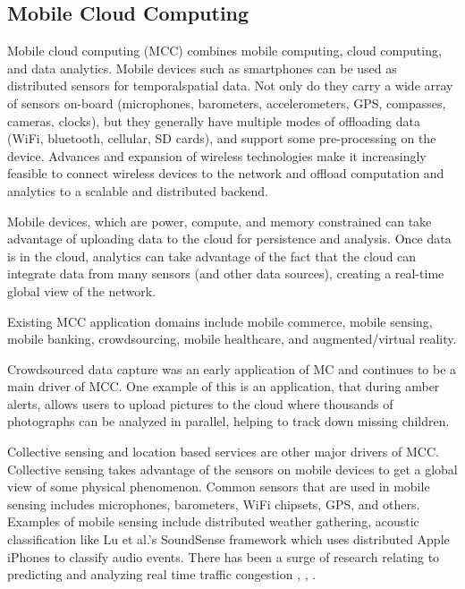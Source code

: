 \documentclass[]{article}
\begin{document}
\subsection{Mobile Cloud Computing} \label{ssec:mobile-cloud-computing}
Mobile cloud computing (MCC) combines mobile computing, cloud computing, and data analytics\cite{wang_mobile_survey_2015}. Mobile devices such as smartphones can be used as distributed sensors for temporalspatial data. Not only do they carry a wide array of sensors on-board (microphones, barometers, accelerometers, GPS, compasses, cameras, clocks), but they generally have multiple modes of offloading data (WiFi, bluetooth, cellular, SD cards), and support some pre-processing on the device. Advances and expansion of wireless technologies make it increasingly feasible to connect wireless devices to the network and offload computation and analytics to a scalable and distributed backend\cite{barbera_offload_2013}.

Mobile devices, which are power, compute, and memory constrained can take advantage of uploading data to the cloud for persistence and analysis. Once data is in the cloud, analytics can take advantage of the fact that the cloud can integrate data from many sensors (and other data sources), creating a real-time global view of the network.

Existing MCC application domains include mobile commerce, mobile sensing, mobile banking, crowdsourcing, mobile healthcare, and augmented/virtual reality.

Crowdsourced data capture was an early application of MC\cite{campbell_rise_2008} and continues to be a main driver of MCC. One example of this is an application, that during amber alerts, allows users to upload pictures to the cloud where thousands of photographs can be analyzed in parallel, helping to track down missing children\cite{satyanarayanan_mobile_2010}.

Collective sensing and location based services are other major drivers of MCC. Collective sensing takes advantage of the sensors on mobile devices to get a global view of some physical phenomenon. Common sensors that are used in mobile sensing includes microphones, barometers, WiFi chipsets, GPS, and others. Examples of mobile sensing include distributed weather gathering, acoustic classification like Lu et al.'s\cite{lu_soundsense:_2009} SoundSense framework which uses distributed Apple iPhones to classify audio events. There has been a surge of research relating to predicting and analyzing real time traffic congestion \cite{thiagarajan_vtrack:_2009}, \cite{herring_using_2010}, \cite{hunter_scaling_2011}. 
\end{document}
